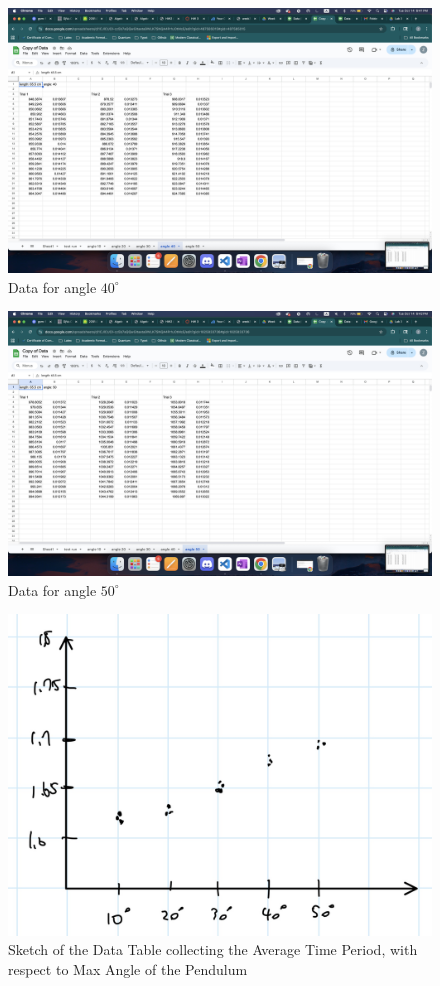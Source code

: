 \documentclass{article}
\begin{document}
\begin{figure}[h!]
    \centering
    \includegraphics[width=150mm]{angle_40.png}
    \caption{Data for angle $40^\circ$}
\end{figure}
\begin{figure}[h!]
    \centering
    \includegraphics[width=150mm]{angle_50.png}
    \caption{Data for angle $50^\circ$}
\end{figure}
\begin{figure}[h!]
    \centering
    \includegraphics[width=150mm]{sketch_data.jpg}
    \caption{Sketch of the Data Table collecting the Average Time Period, with respect to Max Angle of the Pendulum}
\end{figure}
\end{document}
